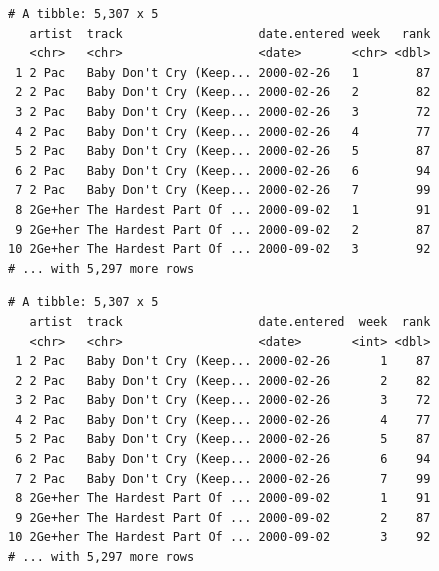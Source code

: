 \documentclass[
  11pt,
]{krantz}
\newenvironment{Shaded}{\begin{snugshade}}{\end{snugshade}}
\newcommand{\CommentTok}[1]{\textcolor[rgb]{0.37,0.37,0.37}{\textit{#1}}}
\newcommand{\DataTypeTok}[1]{\textcolor[rgb]{0.27,0.27,0.27}{#1}}
\newcommand{\KeywordTok}[1]{\textcolor[rgb]{0.27,0.27,0.27}{\textbf{#1}}}
\newcommand{\NormalTok}[1]{#1}
\newcommand{\OperatorTok}[1]{\textcolor[rgb]{0.43,0.43,0.43}{\textbf{#1}}}
\newcommand{\OtherTok}[1]{\textcolor[rgb]{0.37,0.37,0.37}{#1}}
\newcommand{\StringTok}[1]{\textcolor[rgb]{0.5,0.5,0.5}{#1}}
\begin{document}
\begin{verbatim}
# A tibble: 5,307 x 5
   artist  track                   date.entered week   rank
   <chr>   <chr>                   <date>       <chr> <dbl>
 1 2 Pac   Baby Don't Cry (Keep... 2000-02-26   1        87
 2 2 Pac   Baby Don't Cry (Keep... 2000-02-26   2        82
 3 2 Pac   Baby Don't Cry (Keep... 2000-02-26   3        72
 4 2 Pac   Baby Don't Cry (Keep... 2000-02-26   4        77
 5 2 Pac   Baby Don't Cry (Keep... 2000-02-26   5        87
 6 2 Pac   Baby Don't Cry (Keep... 2000-02-26   6        94
 7 2 Pac   Baby Don't Cry (Keep... 2000-02-26   7        99
 8 2Ge+her The Hardest Part Of ... 2000-09-02   1        91
 9 2Ge+her The Hardest Part Of ... 2000-09-02   2        87
10 2Ge+her The Hardest Part Of ... 2000-09-02   3        92
# ... with 5,297 more rows
\end{verbatim}

\begin{Shaded}
\end{Shaded}

\begin{verbatim}
# A tibble: 5,307 x 5
   artist  track                   date.entered  week  rank
   <chr>   <chr>                   <date>       <int> <dbl>
 1 2 Pac   Baby Don't Cry (Keep... 2000-02-26       1    87
 2 2 Pac   Baby Don't Cry (Keep... 2000-02-26       2    82
 3 2 Pac   Baby Don't Cry (Keep... 2000-02-26       3    72
 4 2 Pac   Baby Don't Cry (Keep... 2000-02-26       4    77
 5 2 Pac   Baby Don't Cry (Keep... 2000-02-26       5    87
 6 2 Pac   Baby Don't Cry (Keep... 2000-02-26       6    94
 7 2 Pac   Baby Don't Cry (Keep... 2000-02-26       7    99
 8 2Ge+her The Hardest Part Of ... 2000-09-02       1    91
 9 2Ge+her The Hardest Part Of ... 2000-09-02       2    87
10 2Ge+her The Hardest Part Of ... 2000-09-02       3    92
# ... with 5,297 more rows
\end{verbatim}
\end{document}
